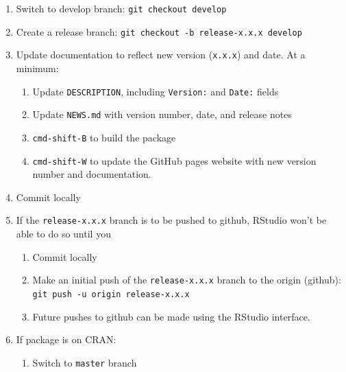 \documentclass{article}
\begin{document}
\begin{enumerate}

  \item Switch to develop branch: \texttt{git checkout develop}

  \item Create a release branch: \texttt{git checkout -b release-x.x.x develop} 

  \item Update documentation to reflect new version (\texttt{x.x.x}) and date.
        At a minimum:
  \begin{enumerate}

    \item Update \texttt{DESCRIPTION}, including \texttt{Version:} and \texttt{Date:} fields 

    \item Update \texttt{NEWS.md} with version number, date, and release notes
    
    \item \texttt{cmd-shift-B} to build the package
	
	\item \texttt{cmd-shift-W} to update the GitHub pages website 
	      with new version number and documentation.

  \end{enumerate}
  \item Commit locally
  
  \item If the \texttt{release-x.x.x} branch is to be pushed to github, RStudio won't be able to do so until you
  \begin{enumerate}

    \item Commit locally

    \item Make an initial push of the \texttt{release-x.x.x} branch
	      to the origin (github): 
		  \texttt{git push -u origin release-x.x.x} 
	
	\item Future pushes to github can be made using the RStudio interface.

  \end{enumerate}
  
  \item If package is on CRAN:
  
	\begin{enumerate}
	  
	  \item Switch to \texttt{master} branch


\end{enumerate}
\end{enumerate}
\end{document}
